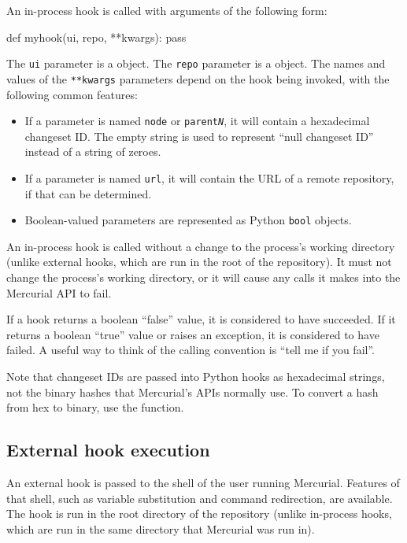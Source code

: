 An in-process hook is called with arguments of the following form:
\begin{codesample2}
  def myhook(ui, repo, **kwargs):
      pass
\end{codesample2}
The \texttt{ui} parameter is a  object.
The \texttt{repo} parameter is a
 object.  The
names and values of the \texttt{**kwargs} parameters depend on the
hook being invoked, with the following common features:
\begin{itemize}
\item If a parameter is named \texttt{node} or
  \texttt{parent\emph{N}}, it will contain a hexadecimal changeset ID.
  The empty string is used to represent ``null changeset ID'' instead
  of a string of zeroes.
\item If a parameter is named \texttt{url}, it will contain the URL of
  a remote repository, if that can be determined.
\item Boolean-valued parameters are represented as Python
  \texttt{bool} objects.
\end{itemize}

An in-process hook is called without a change to the process's working
directory (unlike external hooks, which are run in the root of the
repository).  It must not change the process's working directory, or
it will cause any calls it makes into the Mercurial API to fail.

If a hook returns a boolean ``false'' value, it is considered to have
succeeded.  If it returns a boolean ``true'' value or raises an
exception, it is considered to have failed.  A useful way to think of
the calling convention is ``tell me if you fail''.

Note that changeset IDs are passed into Python hooks as hexadecimal
strings, not the binary hashes that Mercurial's APIs normally use.  To
convert a hash from hex to binary, use the
 function.

\subsection{External hook execution}

An external hook is passed to the shell of the user running Mercurial.
Features of that shell, such as variable substitution and command
redirection, are available.  The hook is run in the root directory of
the repository (unlike in-process hooks, which are run in the same
directory that Mercurial was run in).

